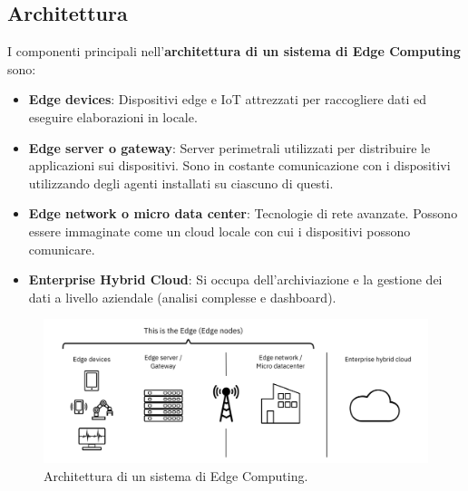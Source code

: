 \subsection{Architettura}
I componenti principali nell'\textbf{architettura di un sistema di Edge Computing} sono:
\begin{itemize}
	\item \textbf{Edge devices}: Dispositivi edge e IoT attrezzati per
	raccogliere dati ed eseguire elaborazioni in locale.
	\item \textbf{Edge server o gateway}: Server perimetrali utilizzati per distribuire le applicazioni sui dispositivi. Sono in costante comunicazione con i dispositivi
	utilizzando degli agenti installati su ciascuno di questi.
	\item \textbf{Edge network o micro data center}: Tecnologie
	di rete avanzate. Possono essere immaginate come un cloud locale con cui i dispositivi possono comunicare.
	\item \textbf{Enterprise Hybrid Cloud}:	Si occupa
	dell'archiviazione e la gestione dei dati a livello aziendale (analisi complesse e dashboard).
\end{itemize}

\begin{figure}[!h]
	\centering
	\includegraphics[width=0.55\linewidth]{img/edge.png}
	\caption{Architettura di un sistema di Edge Computing.}
	\label{fig:edge}
\end{figure}

